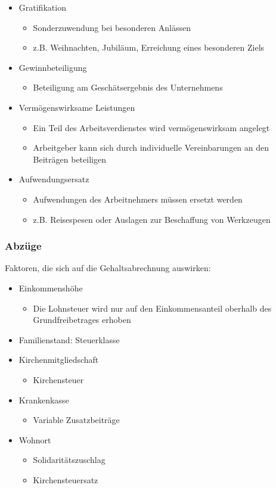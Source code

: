 \begin{itemize}
\begin{itemize}
		\end{itemize}
	\item Gratifikation
		\begin{itemize}
			\item Sonderzuwendung bei besonderen Anlässen
			\item z.B. Weihnachten, Jubiläum, Erreichung eines besonderen Ziels
		\end{itemize}
	\item Gewinnbeteiligung
		\begin{itemize}
			\item Beteiligung am Geschätsergebnis des Unternehmens
		\end{itemize}
	\item Vermögenswirksame Leistungen
		\begin{itemize}
			\item Ein Teil des Arbeitsverdienstes wird vermögenswirksam angelegt
			\item Arbeitgeber kann sich durch individuelle Vereinbarungen an den Beiträgen beteiligen
		\end{itemize}
	\item Aufwendungsersatz
		\begin{itemize}
			\item Aufwendungen des Arbeitnehmers müssen ersetzt werden
			\item z.B. Reisespesen oder Auslagen zur Beschaffung von Werkzeugen
		\end{itemize}
\end{itemize}

\subsubsection{Abzüge}
Faktoren, die sich auf die Gehaltsabrechnung auswirken:
\begin{itemize}
	\item Einkommenshöhe
		\begin{itemize}
			\item Die Lohnsteuer wird nur auf den Einkommensanteil oberhalb des Grundfreibetrages erhoben
		\end{itemize}
	\item Familienstand: Steuerklasse
	\item Kirchenmitgliedschaft
		\begin{itemize}
			\item Kirchensteuer
		\end{itemize}
	\item Krankenkasse
		\begin{itemize}
			\item Variable Zusatzbeiträge
		\end{itemize}
	\item Wohnort
		\begin{itemize}
			\item Solidaritätszuschlag
			\item Kirchensteuersatz
		\end{itemize}
\end{itemize}

